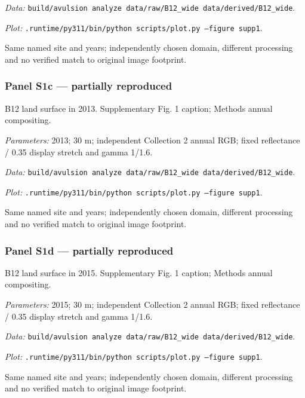 \textit{Data:} \texttt{build/\allowbreak{}avulsion analyze data/\allowbreak{}raw/\allowbreak{}B12\_wide data/\allowbreak{}derived/\allowbreak{}B12\_wide}.

\textit{Plot:} \texttt{.runtime/\allowbreak{}py311/\allowbreak{}bin/\allowbreak{}python scripts/\allowbreak{}plot.py --figure supp1}.

Same named site and years; independently chosen domain, different processing and no verified match to original image footprint.

\subsubsection*{Panel S1c --- partially reproduced}
B12 land surface in 2013. Supplementary Fig. 1 caption; Methods annual compositing.

\textit{Parameters:} 2013; 30 m; independent Collection 2 annual RGB; fixed reflectance / 0.35 display stretch and gamma 1/1.6.

\textit{Data:} \texttt{build/\allowbreak{}avulsion analyze data/\allowbreak{}raw/\allowbreak{}B12\_wide data/\allowbreak{}derived/\allowbreak{}B12\_wide}.

\textit{Plot:} \texttt{.runtime/\allowbreak{}py311/\allowbreak{}bin/\allowbreak{}python scripts/\allowbreak{}plot.py --figure supp1}.

Same named site and years; independently chosen domain, different processing and no verified match to original image footprint.

\subsubsection*{Panel S1d --- partially reproduced}
B12 land surface in 2015. Supplementary Fig. 1 caption; Methods annual compositing.

\textit{Parameters:} 2015; 30 m; independent Collection 2 annual RGB; fixed reflectance / 0.35 display stretch and gamma 1/1.6.

\textit{Data:} \texttt{build/\allowbreak{}avulsion analyze data/\allowbreak{}raw/\allowbreak{}B12\_wide data/\allowbreak{}derived/\allowbreak{}B12\_wide}.

\textit{Plot:} \texttt{.runtime/\allowbreak{}py311/\allowbreak{}bin/\allowbreak{}python scripts/\allowbreak{}plot.py --figure supp1}.

Same named site and years; independently chosen domain, different processing and no verified match to original image footprint.

